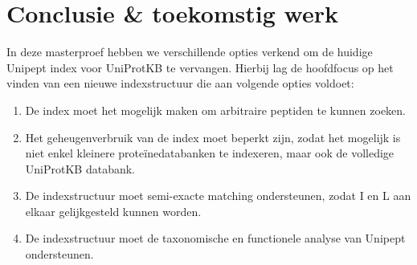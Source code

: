 \chapter{Conclusie \& toekomstig werk}\label{ch:conclusie}
In deze masterproef hebben we verschillende opties verkend om de huidige Unipept index voor UniProtKB te vervangen.
Hierbij lag de hoofdfocus op het vinden van een nieuwe indexstructuur die aan volgende opties voldoet:
\begin{enumerate}
    \item De index moet het mogelijk maken om arbitraire peptiden te kunnen zoeken.
    \item Het geheugenverbruik van de index moet beperkt zijn, zodat het mogelijk is niet enkel kleinere proteïnedatabanken te indexeren, maar ook de volledige UniProtKB databank.
    \item De indexstructuur moet semi-exacte matching ondersteunen, zodat I en L aan elkaar gelijkgesteld kunnen worden.
    \item De indexstructuur moet de taxonomische en functionele analyse van Unipept ondersteunen.
\end{enumerate}

